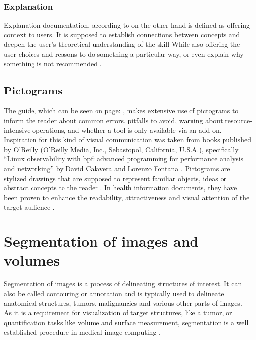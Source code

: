 \subsubsection*{Explanation}
Explanation documentation, according to \citeauthor{procidaDiataxisDocumentationFramework2023} on the other hand is defined as offering context to users.
It is supposed to establish connections between concepts and deepen the user's theoretical understanding of the skill
While also offering the user choices and reasons to do something a particular way, or even explain why something is not recommended \cite{procidaPythonDocsCommunity2022,procidaDiataxisDocumentationFramework2023}.


\subsection{Pictograms}\label{s:b-pictograms}
The guide, which can be seen on page: \pageref{a:guide}, makes extensive use of pictograms to inform the reader about common errors,
pitfalls to avoid, warning about resource-intensive operations, and whether a tool is only available via an add-on.
Inspiration for this kind of visual communication was taken from books published by O'Reilly (O'Reilly Media, Inc., Sebastopol, California, U.S.A.), specifically ``Linux observability with \acrshort{bpf}: advanced programming for performance analysis and networking'' by David Calavera and Lorenzo Fontana \cite{calaveraLinuxObservabilityBPF2019}.
Pictograms are stylized drawings that are supposed to represent familiar objects, ideas or abstract concepts to the reader \cite{dowsePharmacistsAreWords2021}.
In health information documents, they have been proven to enhance the readability, attractiveness and visual attention of the target audience \cite{houtsRolePicturesImproving2006,mansoorEffectPictogramsReadability2003}.\\


\pagebreak
\section{Segmentation of images and volumes}\label{s:b-segmentation-basics}
Segmentation of images is a process of delineating structures of interest.
It can also be called contouring or annotation and is typically used to delineate anatomical structures, tumors,
malignancies and various other parts of images.
As it is a requirement for visualization of target structures, like a tumor, or quantification tasks like volume and surface measurement,
segmentation is a well established procedure in medical image computing \cite{pinterPolymorphSegmentationRepresentation2019,slicercommunity3DSlicerImage2022}.


